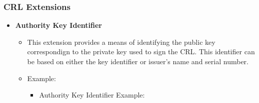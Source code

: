 \documentclass[a4paper]{article}
\begin{document}
    \subsubsection{CRL Extensions}
        \begin{itemize}
            \item \textbf{Authority Key Identifier}
                \begin{itemize}
                    \item This extension provides a means of identifying the public key correspondign to the private key used to sign the CRL. This identifier can be based on either the key identifier or issuer's name and serial number. 
                    \item Example:
                        \begin{itemize}
                            \item Authority Key Identifier Example:


\end{itemize}
\end{itemize}
\end{itemize}
\end{document}
